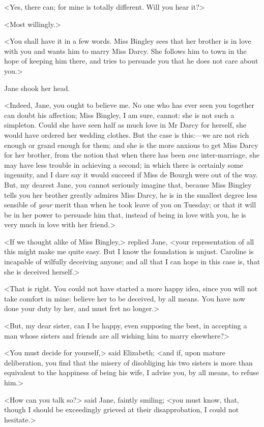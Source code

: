 <Yes, there can; for mine is totally different. Will you hear it?>

<Most willingly.>

<You shall have it in a few words. Miss Bingley sees that her brother is in love with you and wants him to marry Miss Darcy. She follows him to town in the hope of keeping him there, and tries to persuade you that he does not care about you.>

Jane shook her head.

<Indeed, Jane, you ought to believe me. No one who has ever seen you together can doubt his affection; Miss Bingley, I am sure, cannot: she is not such a simpleton. Could she have seen half as much love in Mr Darcy for herself, she would have ordered her wedding clothes. But the case is this:—we are not rich enough or grand enough for them; and she is the more anxious to get Miss Darcy for her brother, from the notion that when there has been \textit{one} inter-marriage, she may have less trouble in achieving a second; in which there is certainly some ingenuity, and I dare say it would succeed if Miss de Bourgh were out of the way. But, my dearest Jane, you cannot seriously imagine that, because Miss Bingley tells you her brother greatly admires Miss Darcy, he is in the smallest degree less sensible of \textit{your} merit than when he took leave of you on Tuesday; or that it will be in her power to persuade him that, instead of being in love with you, he is very much in love with her friend.>

<If we thought alike of Miss Bingley,> replied Jane, <your representation of all this might make me quite easy. But I know the foundation is unjust. Caroline is incapable of wilfully deceiving anyone; and all that I can hope in this case is, that she is deceived herself.>

<That is right. You could not have started a more happy idea, since you will not take comfort in mine: believe her to be deceived, by all means. You have now done your duty by her, and must fret no longer.>

<But, my dear sister, can I be happy, even supposing the best, in accepting a man whose sisters and friends are all wishing him to marry elsewhere?>

<You must decide for yourself,> said Elizabeth; <and if, upon mature deliberation, you find that the misery of disobliging his two sisters is more than equivalent to the happiness of being his wife, I advise you, by all means, to refuse him.>

<How can you talk so?> said Jane, faintly smiling; <you must know, that, though I should be exceedingly grieved at their disapprobation, I could not hesitate.>

